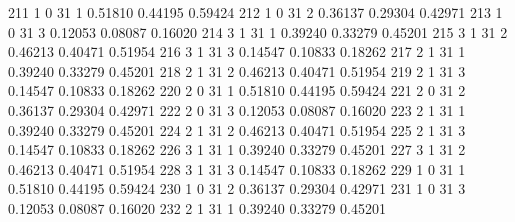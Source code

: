 \documentclass{article}
\begin{document}
\begin{Woutput}
 211      1       0      31       1       0.51810    0.44195    0.59424
 212      1       0      31       2       0.36137    0.29304    0.42971
 213      1       0      31       3       0.12053    0.08087    0.16020
 214      3       1      31       1       0.39240    0.33279    0.45201
 215      3       1      31       2       0.46213    0.40471    0.51954
 216      3       1      31       3       0.14547    0.10833    0.18262
 217      2       1      31       1       0.39240    0.33279    0.45201
 218      2       1      31       2       0.46213    0.40471    0.51954
 219      2       1      31       3       0.14547    0.10833    0.18262
 220      2       0      31       1       0.51810    0.44195    0.59424
 221      2       0      31       2       0.36137    0.29304    0.42971
 222      2       0      31       3       0.12053    0.08087    0.16020
 223      2       1      31       1       0.39240    0.33279    0.45201
 224      2       1      31       2       0.46213    0.40471    0.51954
 225      2       1      31       3       0.14547    0.10833    0.18262
 226      3       1      31       1       0.39240    0.33279    0.45201
 227      3       1      31       2       0.46213    0.40471    0.51954
 228      3       1      31       3       0.14547    0.10833    0.18262
 229      1       0      31       1       0.51810    0.44195    0.59424
 230      1       0      31       2       0.36137    0.29304    0.42971
 231      1       0      31       3       0.12053    0.08087    0.16020
 232      2       1      31       1       0.39240    0.33279    0.45201


\end{Woutput}
\end{document}
